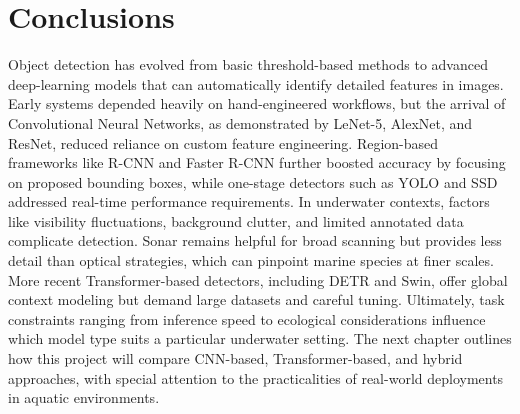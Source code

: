 \section{Conclusions}
Object detection has evolved from basic threshold-based methods to advanced deep-learning models that can automatically identify detailed features in images. Early systems depended heavily on hand-engineered workflows, but the arrival of Convolutional Neural Networks, as demonstrated by LeNet-5, AlexNet, and ResNet, reduced reliance on custom feature engineering. Region-based frameworks like R-CNN and Faster R-CNN further boosted accuracy by focusing on proposed bounding boxes, while one-stage detectors such as YOLO and SSD addressed real-time performance requirements.
In underwater contexts, factors like visibility fluctuations, background clutter, and limited annotated data complicate detection. Sonar remains helpful for broad scanning but provides less detail than optical strategies, which can pinpoint marine species at finer scales. More recent Transformer-based detectors, including DETR and Swin, offer global context modeling but demand large datasets and careful tuning. Ultimately, task constraints ranging from inference speed to ecological considerations influence which model type suits a particular underwater setting. The next chapter outlines how this project will compare CNN-based, Transformer-based, and hybrid approaches, with special attention to the practicalities of real-world deployments in aquatic environments.

